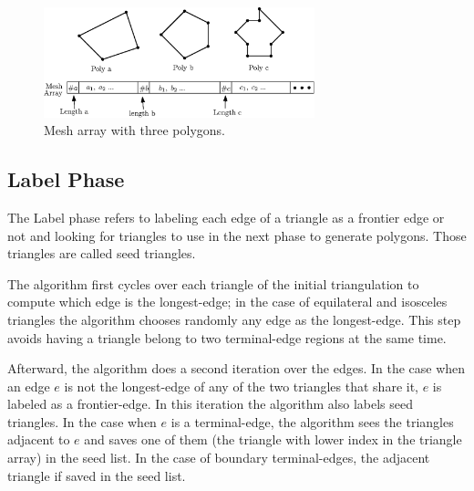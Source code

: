 
\begin{figure}[]
    \centering
\includegraphics[width=0.7\textwidth]{meshdatastruct.eps}
    \caption{Mesh array with three polygons.} 
    \label{fig:meshdatastruct}
\end{figure}

\subsection{Label Phase}
\label{subsec:Labelpohase}

The Label phase refers to labeling each edge of a triangle as a frontier edge or not and looking for triangles to use in the next phase to generate polygons. Those triangles are called seed triangles.

The algorithm first cycles over each triangle of the initial triangulation to compute which edge is the longest-edge; in the case of equilateral and isosceles triangles the algorithm chooses randomly any edge as the longest-edge. This step avoids having a triangle belong to two terminal-edge regions at the same time. 

Afterward, the algorithm does a second iteration over the edges. In the case when an edge $e$ is not the longest-edge of any of the two triangles that share it, $e$ is labeled as a frontier-edge. In this iteration the algorithm also labels seed triangles. In the case when $e$ is a terminal-edge, the algorithm sees the triangles adjacent to $e$ and saves one of them (the triangle with lower index in the triangle array) in the seed list. In the case of boundary terminal-edges, the adjacent triangle if saved in the seed list. 


